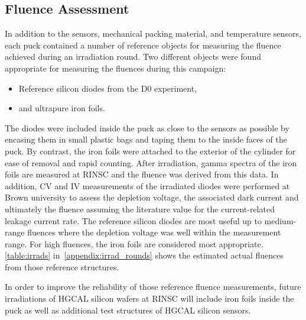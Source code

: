 \subsection{Fluence Assessment}
In addition to the sensors, mechanical packing material, and temperature sensors, each puck contained a number of reference objects for measuring the fluence achieved during an irradiation round. 
Two different objects were found appropriate for measuring the fluences during this campaign: 
\begin{itemize}
  \item Reference silicon diodes from the D0 experiment, 
  \item and ultrapure iron foils. 
\end{itemize}  
The diodes were included inside the puck as close to the sensors as possible by encasing them in small plastic bags and taping them to the inside faces of the puck. 
By contrast, the iron foils were attached to the exterior of the cylinder for ease of removal and rapid counting. \newline
After irradiation, gamma spectra of the iron foils are measured at RINSC and the fluence was derived from this data.
In addition, CV and IV measurements of the irradiated diodes were performed at Brown university to assess the depletion voltage, the associated dark current and ultimately the fluence assuming the literature value for the current-related leakage current rate.\newline
The reference silicon diodes are most useful up to medium-range fluences where the depletion voltage was well within the measurement range.
For high fluences, the iron foils are considered most appropriate.
\ref{table:irrads} in~\ref{appendix:irrad_rounds} shows the estimated actual fluences from those reference structures.

In order to improve the reliability of those reference fluence measurements, future irradiations of HGCAL silicon wafers at RINSC will include iron foils inside the puck as well as additional test structures of HGCAL silicon sensors.


